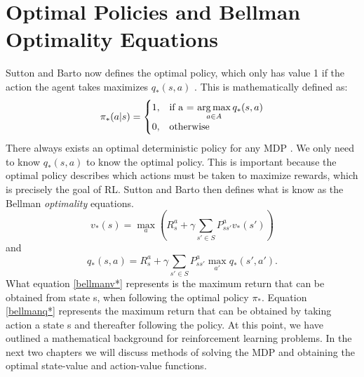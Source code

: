 \section{Optimal Policies and Bellman Optimality Equations}
Sutton and Barto now defines the optimal policy, which only has value 1 if the action the agent takes maximizes $q_*(s,a)$ \cite{sutton_barto}.
This is mathematically defined as:
\begin{align}
	\pi_{*}(a|s)=\begin{cases}
		1, & \text{if a = $\operatorname*{arg\,max}\limits_{a \in A}q_* (s,a)$}\\
		0, & \text{otherwise}
	\end{cases}
	\label{eq:pi_*}
\end{align}
There always exists an optimal deterministic policy for any MDP \cite{sutton_barto}. We only need to know $q_* (s,a)$ to know the optimal policy. This is important because the optimal policy describes which actions must be taken to maximize rewards, which is precisely the goal of RL.
Sutton and Barto \cite{sutton_barto} then defines what is know as the Bellman \textit{optimality} equations.
\begin{equation}
	v_*(s) = \max\limits_{a}(R^{a}_s+\gamma\sum_{s'\in S}P^{a}_{ss'}v_*(s'))
	\label{bellmanv*}
\end{equation}
and
\begin{equation}
	q_*(s,a) = R^{a}_s +\gamma \sum_{s'\in S}P^{a}_{ss'}\max\limits_{a'}q_*(s',a').
	\label{bellmanq*}
\end{equation}
What equation \ref{bellmanv*} represents is the maximum return that can be obtained from state s, when following the optimal policy $\pi_*$. Equation \ref{bellmanq*} represents the maximum return that can be obtained by taking action a state s and thereafter following the policy.
At this point, we have outlined a mathematical background for reinforcement learning problems.
In the next two chapters we will discuss methods of solving the MDP and obtaining the optimal state-value and action-value functions. 

